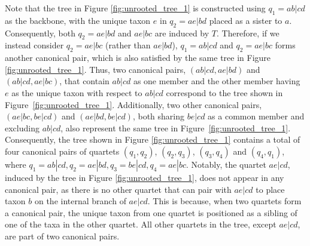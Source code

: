 \documentclass[10pt,a4paper]{article}
\begin{document}
Note that the tree in Figure \ref{fig:unrooted_tree_1} is constructed using $q_1 = ab|cd$ as the backbone, with the unique taxon $e$ in $q_2 = ae|bd$ placed as a sister to $a$. Consequently, both $q_2 = ae|bd$ and $ae|bc$ are induced by $T$. Therefore, if we instead consider $q_2 = ae|bc$ (rather than $ae|bd$), $q_1 = ab|cd$ and $q_2 = ae|bc$ forms another canonical pair, which is also satisfied by the same tree in Figure \ref{fig:unrooted_tree_1}.
Thus, two canonical pairs, $(ab|cd, ae|bd)$ and $(ab|cd, ae|bc)$, that contain $ab|cd$ as one member and the other member having $e$ as the unique taxon with respect to $ab|cd$ correspond to the tree shown in Figure~\ref{fig:unrooted_tree_1}. Additionally, two other canonical pairs, $(ae|bc, be|cd)$ and $(ae|bd, be|cd)$, both sharing $be|cd$ as a common member and excluding $ab|cd$, also represent the same tree in Figure~\ref{fig:unrooted_tree_1}. Consequently, the tree shown in Figure \ref{fig:unrooted_tree_1} contains a total of four canonical pairs of quartets $(q_1,q_2)$, $(q_2,q_3)$, $(q_3,q_4)$ and $(q_4,q_1)$, where $q_1 = ab|cd, q_2 = ae|bd, q_3= be|cd, q_4 = ae|bc$. Notably, the quartet $ae|cd$, induced by the tree in Figure \ref{fig:unrooted_tree_1}, does not appear in any canonical pair, as there is no other quartet that can pair with $ae|cd$ to place taxon $b$ on the internal branch of $ae|cd$. This is because, when two quartets form a canonical pair, the unique taxon from one quartet is positioned as a sibling of one of the taxa in the other quartet. All other quartets in the tree, except $ae|cd$, are part of two canonical pairs.

\end{document}
